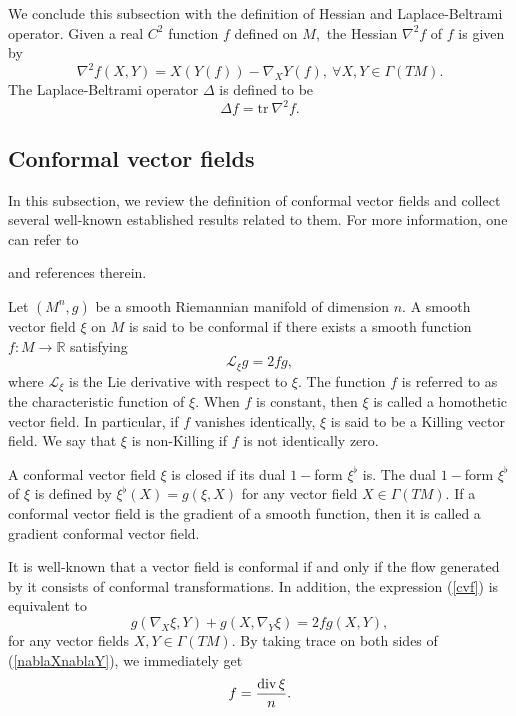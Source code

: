 \documentclass[10pt,leqno,oneside]{amsart}
\begin{document}
         We conclude this subsection with the definition of Hessian and Laplace-Beltrami operator. Given a real $C^2$ function $f$ defined on $M,$ the Hessian $\nabla^2f$ of $f$ is given by
         \begin{equation}\label{Hessian}
            \nabla^2f(X,Y)=X(Y(f))-\nabla_XY(f), ~\forall X, Y\in\Gamma(TM).
         \end{equation}
         The Laplace-Beltrami operator $\Delta $ is defined to be
         \[\Delta f=\text{tr}~\nabla^2f.\]




    \subsection{Conformal vector fields}

         In this subsection, we review the definition of conformal vector fields and collect several well-known established results related to them. For more information, one can refer to {\cite{DuggalSharma1999} \cite{SD2024} \cite{Yano1975} and references therein.

         Let $(M^n ,g)$ be a smooth Riemannian manifold of dimension $n.$ A smooth vector field $\xi$ on $M$ is said to be conformal if there exists a smooth function $f:M\rightarrow{\mathbb R}$ satisfying
         \begin{equation}\label{cvf}\mathcal L_{\xi}g=2f g,\end{equation}
         where $\mathcal L_{\xi}$ is the Lie derivative with respect to $\xi.$ The function $f$ is referred to as the characteristic function of $\xi.$ When $f$ is constant, then $\xi$ is called a homothetic vector field. In particular, if $f$ vanishes identically, $\xi$ is said to be a Killing vector field. We say that $\xi$ is non-Killing if $f$ is not identically zero.

         A conformal vector field $\xi$ is closed if its dual $1-$form $\xi^{\flat}$ is. The dual $1-$form $\xi^{\flat}$ of $\xi$ is defined by $\xi^{\flat}(X)=g(\xi,X)$ for any vector field $ X\in\Gamma(TM).$ If a conformal vector field is the gradient of a smooth function, then it is called a gradient conformal vector field.

         It is well-known that a vector field is conformal if and only if the flow generated by it consists of conformal transformations. In addition, the expression (\ref{cvf}) is equivalent to
         \begin{equation}\label{nablaXnablaY} g(\nabla_X\xi,Y)+g(X,\nabla_Y\xi)=2fg(X,Y),\end{equation}
         for any vector fields $X, Y\in\Gamma(TM).$ By taking trace on both sides of (\ref{nablaXnablaY}), we immediately get
         \begin{equation*}\label{cffdiv}f=\frac{ {{\rm div}\,\xi}}{n}.\end{equation*}

}
\end{document}
